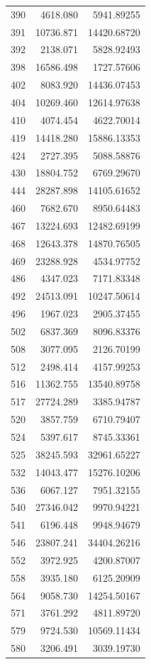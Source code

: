 \documentclass[
  12pt,
]{article}
\begin{document}
\begin{longtable}[]{@{}lrr@{}}
390 & 4618.080 & 5941.89255 \\
391 & 10736.871 & 14420.68720 \\
392 & 2138.071 & 5828.92493 \\
398 & 16586.498 & 1727.57606 \\
402 & 8083.920 & 14436.07453 \\
404 & 10269.460 & 12614.97638 \\
410 & 4074.454 & 4622.70014 \\
419 & 14418.280 & 15886.13353 \\
424 & 2727.395 & 5088.58876 \\
430 & 18804.752 & 6769.29670 \\
444 & 28287.898 & 14105.61652 \\
460 & 7682.670 & 8950.64483 \\
467 & 13224.693 & 12482.69199 \\
468 & 12643.378 & 14870.76505 \\
469 & 23288.928 & 4534.97752 \\
486 & 4347.023 & 7171.83348 \\
492 & 24513.091 & 10247.50614 \\
496 & 1967.023 & 2905.37455 \\
502 & 6837.369 & 8096.83376 \\
508 & 3077.095 & 2126.70199 \\
512 & 2498.414 & 4157.99253 \\
516 & 11362.755 & 13540.89758 \\
517 & 27724.289 & 3385.94787 \\
520 & 3857.759 & 6710.79407 \\
524 & 5397.617 & 8745.33361 \\
525 & 38245.593 & 32961.65227 \\
532 & 14043.477 & 15276.10206 \\
536 & 6067.127 & 7951.32155 \\
540 & 27346.042 & 9970.94221 \\
541 & 6196.448 & 9948.94679 \\
546 & 23807.241 & 34404.26216 \\
552 & 3972.925 & 4200.87007 \\
558 & 3935.180 & 6125.20909 \\
564 & 9058.730 & 14254.50167 \\
571 & 3761.292 & 4811.89720 \\
579 & 9724.530 & 10569.11434 \\
580 & 3206.491 & 3039.19730 \\

\end{longtable}
\end{document}
